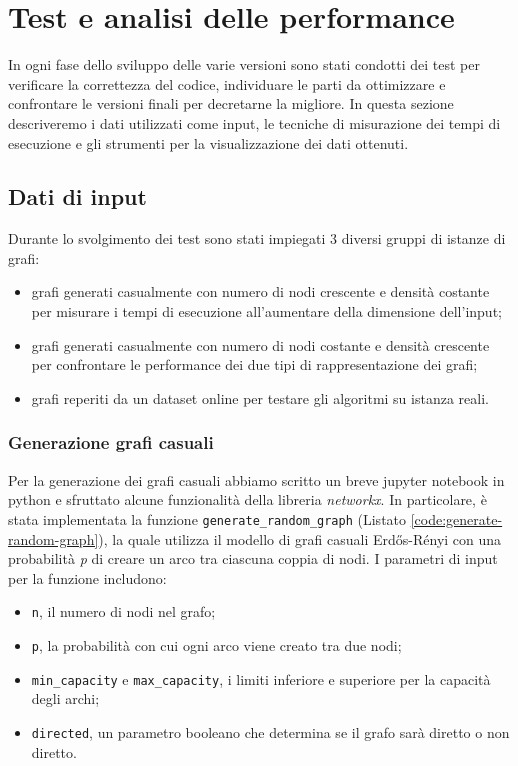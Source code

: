     \newpage
    
    \section{Test e analisi delle performance}

        In ogni fase dello sviluppo delle varie versioni sono stati condotti dei test per verificare la correttezza del codice, individuare le parti da ottimizzare e confrontare le versioni finali per decretarne la migliore.
        In questa sezione descriveremo i dati utilizzati come input, le tecniche di misurazione dei tempi di esecuzione e gli strumenti per la visualizzazione dei dati ottenuti.

        \subsection{Dati di input}\label{sec:input-data}

            Durante lo svolgimento dei test sono stati impiegati 3 diversi gruppi di istanze di grafi:
            \begin{itemize}
                \item grafi generati casualmente con numero di nodi crescente e densità costante per misurare i tempi di esecuzione all'aumentare della dimensione dell'input;
                \item grafi generati casualmente con numero di nodi costante e densità crescente per confrontare le performance dei due tipi di rappresentazione dei grafi;
                \item grafi reperiti da un dataset online per testare gli algoritmi su istanza reali.
            \end{itemize}

            \subsubsection*{Generazione grafi casuali}

                Per la generazione dei grafi casuali abbiamo scritto un breve jupyter notebook in python e sfruttato alcune funzionalità della libreria \textit{networkx}.
                In particolare, è stata implementata la funzione \verb|generate_random_graph| (Listato \ref{code:generate-random-graph}), la quale utilizza il modello di grafi casuali Erdős-Rényi con una probabilità \textit{p} di creare un arco tra ciascuna coppia di nodi. I parametri di input per la funzione includono:
                \begin{itemize}
                    \item \verb|n|, il numero di nodi nel grafo;
                    \item \verb|p|, la probabilità con cui ogni arco viene creato tra due nodi;
                    \item \verb|min_capacity| e \verb|max_capacity|, i limiti inferiore e superiore per la capacità degli archi;
                    \item \verb|directed|, un parametro booleano che determina se il grafo sarà diretto o non diretto.
                \end{itemize}
                
